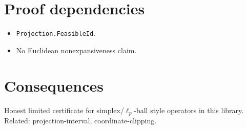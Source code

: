 \documentclass[12pt]{article}
\theoremstyle{plain}
\theoremstyle{definition}
\theoremstyle{remark}
\begin{document}
\section{Proof dependencies}
{\raggedright\sloppy
\begin{itemize}\item \texttt{Projection.FeasibleId}.\item No Euclidean nonexpansiveness claim.\end{itemize}
\par}

\section{Consequences}
{\raggedright\sloppy
Honest limited certificate for simplex/$\ell_p$-ball style operators in this library. Related: projection-interval, coordinate-clipping.
\par}
\end{document}
